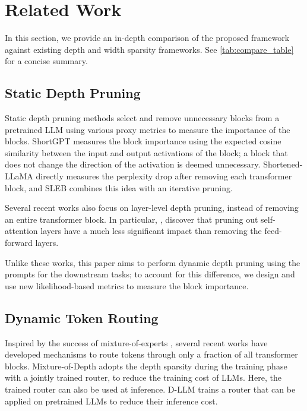 

\section{Related Work}

In this section, we provide an in-depth comparison of the proposed framework against existing depth and width sparsity frameworks. See \cref{tab:compare_table} for a concise summary.

\subsection{Static Depth Pruning}

Static depth pruning methods select and remove unnecessary blocks from a pretrained LLM using various proxy metrics to measure the importance of the blocks. ShortGPT \citep{men2024shortgpt} measures the block importance using the expected cosine similarity between the input and output activations of the block; a block that does not change the direction of the activation is deemed unnecessary. Shortened-LLaMA \citep{kim2024shortened} directly measures the perplexity drop after removing each transformer block, and SLEB \citep{songsleb} combines this idea with an iterative pruning.

Several recent works also focus on layer-level depth pruning, instead of removing an entire transformer block. In particular, \citet{siddiqui24}, \citet{he24} discover that pruning out self-attention layers have a much less significant impact than removing the feed-forward layers.


Unlike these works, this paper aims to perform dynamic depth pruning using the prompts for the downstream tasks; to account for this difference, we design and use new likelihood-based metrics to measure the block importance.

\subsection{Dynamic Token Routing}

Inspired by the success of mixture-of-experts \citep{jacobs1991adaptive,fedus2022switch}, several recent works have developed mechanisms to route tokens through only a fraction of all transformer blocks. Mixture-of-Depth \citep{raposo2024mixture} adopts the depth sparsity during the training phase with a jointly trained router, to reduce the training cost of LLMs. Here, the trained router can also be used at inference. D-LLM \citep{wangd} trains a router that can be applied on pretrained LLMs to reduce their inference cost.


